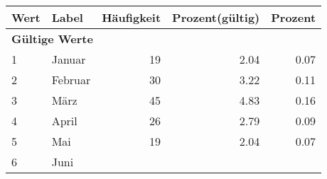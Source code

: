      \begin{longtable}{lXrrr}
     \toprule
     \textbf{Wert} & \textbf{Label} & \textbf{Häufigkeit} & \textbf{Prozent(gültig)} & \textbf{Prozent} \\
     \endhead
     \midrule
     \multicolumn{5}{l}{\textbf{Gültige Werte}}\\

     1 &
     \multicolumn{1}{X}{ Januar   } &


       \num{19} &
       \num[round-mode=places,round-precision=2]{2.04} &
         \num[round-mode=places,round-precision=2]{0.07} \\

     2 &
     \multicolumn{1}{X}{ Februar   } &


       \num{30} &
       \num[round-mode=places,round-precision=2]{3.22} &
         \num[round-mode=places,round-precision=2]{0.11} \\

     3 &
     \multicolumn{1}{X}{ März   } &


       \num{45} &
       \num[round-mode=places,round-precision=2]{4.83} &
         \num[round-mode=places,round-precision=2]{0.16} \\

     4 &
     \multicolumn{1}{X}{ April   } &


       \num{26} &
       \num[round-mode=places,round-precision=2]{2.79} &
         \num[round-mode=places,round-precision=2]{0.09} \\

     5 &
     \multicolumn{1}{X}{ Mai   } &


       \num{19} &
       \num[round-mode=places,round-precision=2]{2.04} &
         \num[round-mode=places,round-precision=2]{0.07} \\

     6 &
     \multicolumn{1}{X}{ Juni   } &



\end{longtable}

